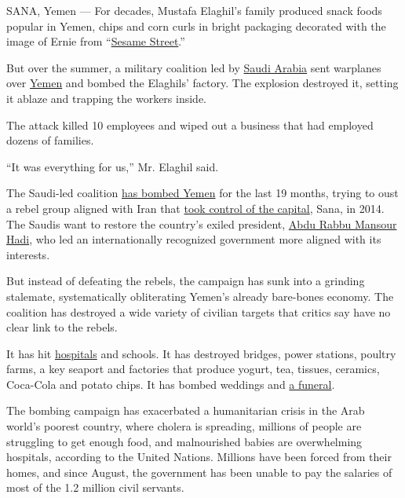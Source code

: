 SANA, Yemen --- For decades, Mustafa Elaghil's family produced snack
foods popular in Yemen, chips and corn curls in bright packaging
decorated with the image of Ernie from
``\href{http://www.sesamestreet.org/}{Sesame Street}.''

But over the summer, a military coalition led by
\href{http://www.nytimes3xbfgragh.onion/topic/destination/saudi-arabia?8qa}{Saudi
Arabia} sent warplanes over
\href{http://www.nytimes3xbfgragh.onion/topic/destination/yemen?8qa}{Yemen}
and bombed the Elaghils' factory. The explosion destroyed it, setting it
ablaze and trapping the workers inside.

The attack killed 10 employees and wiped out a business that had
employed dozens of families.

``It was everything for us,'' Mr. Elaghil said.

The Saudi-led coalition
\href{http://www.nytimes3xbfgragh.onion/2016/10/31/world/middleeast/airstrikes-kill-dozens-in-western-yemen.html?rref=collection\%2Ftimestopic\%2FYemen\&action=click\&contentCollection=world\&region=stream\&module=stream_unit\&version=latest\&contentPlacement=3\&pgtype=collection}{has
bombed Yemen} for the last 19 months, trying to oust a rebel group
aligned with Iran that
\href{http://www.nytimes3xbfgragh.onion/2014/09/22/world/middleeast/yemens-prime-minister-resigns-amid-chaos-and-another-cease-fire.html}{took
control of the capital}, Sana, in 2014. The Saudis want to restore the
country's exiled president,
\href{http://www.nytimes3xbfgragh.onion/2015/02/22/world/africa/yemens-former-president-flees-capital.html}{Abdu
Rabbu Mansour Hadi}, who led an internationally recognized government
more aligned with its interests.

But instead of defeating the rebels, the campaign has sunk into a
grinding stalemate, systematically obliterating Yemen's already
bare-bones economy. The coalition has destroyed a wide variety of
civilian targets that critics say have no clear link to the rebels.

It has hit
\href{http://www.nytimes3xbfgragh.onion/2016/08/16/world/middleeast/yemen-doctors-without-borders-hospital-bombing.html}{hospitals}
and schools. It has destroyed bridges, power stations, poultry farms, a
key seaport and factories that produce yogurt, tea, tissues, ceramics,
Coca-Cola and potato chips. It has bombed weddings and
\href{http://www.nytimes3xbfgragh.onion/2016/10/09/world/middleeast/yemen-saudi-arabia-houthis-rebels.html}{a
funeral}.

The bombing campaign has exacerbated a humanitarian crisis in the Arab
world's poorest country, where cholera is spreading, millions of people
are struggling to get enough food, and malnourished babies are
overwhelming hospitals, according to the United Nations. Millions have
been forced from their homes, and since August, the government has been
unable to pay the salaries of most of the 1.2 million civil servants.

